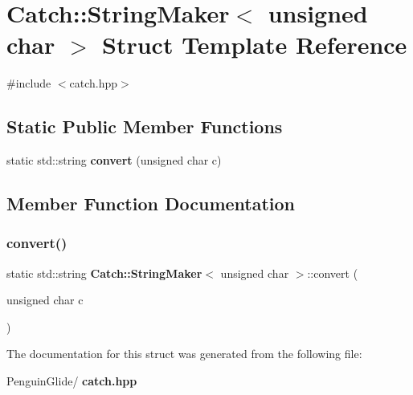 \section{Catch\+::String\+Maker$<$ unsigned char $>$ Struct Template Reference}
\label{struct_catch_1_1_string_maker_3_01unsigned_01char_01_4}


{\ttfamily \#include $<$catch.\+hpp$>$}

\subsection*{Static Public Member Functions}
\begin{DoxyCompactItemize}
\item 
static std\+::string \textbf{ convert} (unsigned char c)
\end{DoxyCompactItemize}


\subsection{Member Function Documentation}
\mbox{\label{struct_catch_1_1_string_maker_3_01unsigned_01char_01_4_a7cddb1df26275b9a8e631466eb122f59}} 
\subsubsection{convert()}
{\footnotesize\ttfamily static std\+::string \textbf{ Catch\+::\+String\+Maker}$<$ unsigned char $>$\+::convert (\begin{DoxyParamCaption}\item[{unsigned char}]{c }\end{DoxyParamCaption})\hspace{0.3cm}{\ttfamily [static]}}



The documentation for this struct was generated from the following file\+:\begin{DoxyCompactItemize}
\item 
Penguin\+Glide/\textbf{ catch.\+hpp}\end{DoxyCompactItemize}
